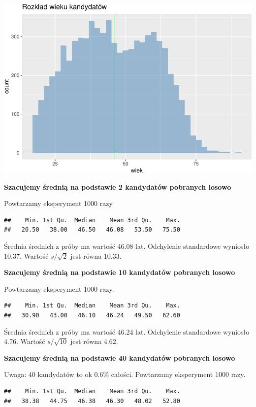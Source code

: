 \documentclass[
  openany]{book}
\begin{document}
\includegraphics{_main_files/figure-latex/unnamed-chunk-29-1.pdf}

\textbf{Szacujemy średnią na podstawie 2 kandydatów pobranych losowo}

Powtarzamy eksperyment 1000 razy

\begin{verbatim}
##    Min. 1st Qu.  Median    Mean 3rd Qu.    Max. 
##   20.50   38.00   46.50   46.08   53.50   75.50
\end{verbatim}

Średnia średnich z próby ma wartość 46.08 lat.
Odchylenie standardowe wyniosło 10.37.
Wartość \(s/\sqrt{2}\) jest równa 10.33.

\textbf{Szacujemy średnią na podstawie 10 kandydatów pobranych losowo}

Powtarzamy eksperyment 1000 razy.

\begin{verbatim}
##    Min. 1st Qu.  Median    Mean 3rd Qu.    Max. 
##   30.90   43.00   46.10   46.24   49.50   62.60
\end{verbatim}

Średnia średnich z próby ma wartość 46.24 lat.
Odchylenie standardowe wyniosło 4.76.
Wartość \(s/\sqrt{10}\) jest równa 4.62.

\textbf{Szacujemy średnią na podstawie 40 kandydatów pobranych losowo}

Uwaga: 40 kandydatów to ok 0.6\% całości.
Powtarzamy eksperyment 1000 razy.

\begin{verbatim}
##    Min. 1st Qu.  Median    Mean 3rd Qu.    Max. 
##   38.38   44.75   46.38   46.30   48.02   52.80
\end{verbatim}
\end{document}
